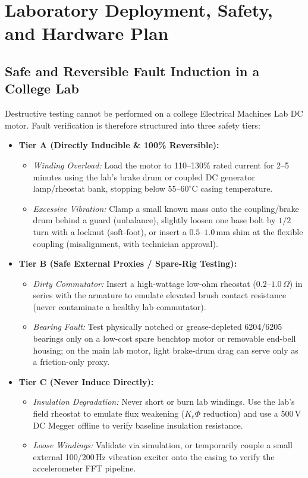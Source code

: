 \documentclass[11pt,a4paper]{article}
\begin{document}
\section{Laboratory Deployment, Safety, and Hardware Plan}

\subsection{Safe and Reversible Fault Induction in a College Lab}

Destructive testing cannot be performed on a college Electrical Machines Lab DC motor. Fault verification is therefore structured into three safety tiers:
\begin{itemize}[leftmargin=*, itemsep=3pt]
    \item \textbf{Tier A (Directly Inducible \& 100\% Reversible):}
    \begin{itemize}[noitemsep]
        \item \emph{Winding Overload:} Load the motor to 110--130\% rated current for 2--5 minutes using the lab's brake drum or coupled DC generator lamp/rheostat bank, stopping below $55\text{--}60^\circ\text{C}$ casing temperature.
        \item \emph{Excessive Vibration:} Clamp a small known mass onto the coupling/brake drum behind a guard (unbalance), slightly loosen one base bolt by $1/2$ turn with a locknut (soft-foot), or insert a $0.5\text{--}1.0\,\text{mm}$ shim at the flexible coupling (misalignment, with technician approval).
    \end{itemize}
    \item \textbf{Tier B (Safe External Proxies / Spare-Rig Testing):}
    \begin{itemize}[noitemsep]
        \item \emph{Dirty Commutator:} Insert a high-wattage low-ohm rheostat ($0.2\text{--}1.0\,\Omega$) in series with the armature to emulate elevated brush contact resistance (never contaminate a healthy lab commutator).
        \item \emph{Bearing Fault:} Test physically notched or grease-depleted 6204/6205 bearings only on a low-cost spare benchtop motor or removable end-bell housing; on the main lab motor, light brake-drum drag can serve only as a friction-only proxy.
    \end{itemize}
    \item \textbf{Tier C (Never Induce Directly):}
    \begin{itemize}[noitemsep]
        \item \emph{Insulation Degradation:} Never short or burn lab windings. Use the lab's field rheostat to emulate flux weakening ($K_e\Phi$ reduction) and use a 500\,V DC Megger offline to verify baseline insulation resistance.
        \item \emph{Loose Windings:} Validate via simulation, or temporarily couple a small external 100/200\,Hz vibration exciter onto the casing to verify the accelerometer FFT pipeline.
    \end{itemize}
\end{itemize}
\end{document}
